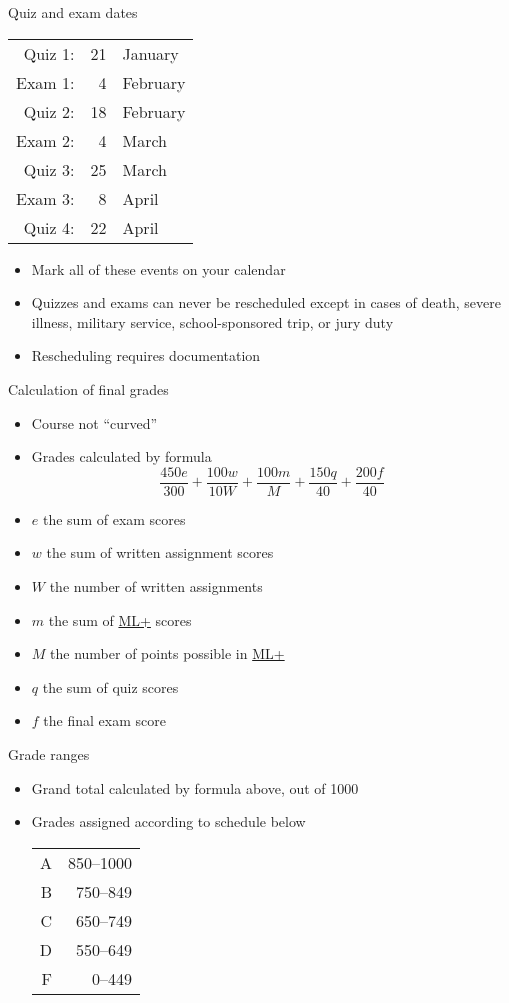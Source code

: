 \documentclass[xcolor=dvipsnames]{beamer}
\theoremstyle{definition}
\begin{document}
\begin{frame}{Quiz and exam dates}
\begin{center}\begin{tabular}{rrl}
Quiz 1:&21&January\\
Exam 1:&4&February\\
Quiz 2:&18&February\\
Exam 2:&4&March\\
Quiz 3:&25&March\\
Exam 3:&8&April\\
Quiz 4:&22&April
\end{tabular}\end{center}
\begin{itemize}
\item Mark all of these events on your calendar
\item Quizzes and exams can \alert{never} be rescheduled
except in cases of death, severe illness, military service,
school-sponsored trip, or jury duty
\item Rescheduling requires documentation
\end{itemize}
\end{frame}

\begin{frame}{Calculation of final grades}
\begin{itemize}
\item Course not ``curved''
\item Grades calculated by formula
\[\frac{450e}{300}+\frac{100w}{10W}
+\frac{100m}{M}+\frac{150q}{40}+\frac{200f}{40}\]
\item $e$ the sum of exam scores
\item $w$ the sum of written assignment scores
\item $W$ the number of written assignments
\item $m$ the sum of
\href{http://iastate.mylabsplus.com}{\color{blue}ML+} scores
\item $M$ the number of points possible in
\href{http://iastate.mylabsplus.com}{\color{blue}ML+}
\item $q$ the sum of quiz scores
\item $f$ the final exam score
\end{itemize}
\end{frame}

\begin{frame}{Grade ranges}
\begin{itemize}
\item Grand total calculated by formula above, out of 1000
\item Grades assigned according to schedule below
\begin{center}\begin{tabular}{rr}
A&850--1000\\
B&750--849\\
C&650--749\\
D&550--649\\
F&0--449
\end{tabular}\end{center}
\end{itemize}
\end{frame}
\end{document}
